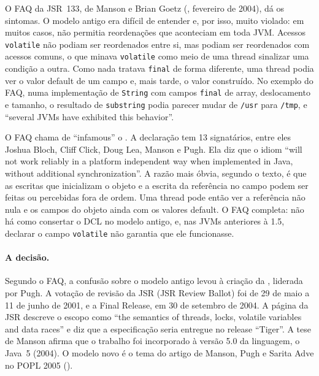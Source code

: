 O FAQ da JSR~133, de Manson e Brian Goetz
(, fevereiro de 2004), dá os sintomas. O
modelo antigo era difícil de entender e, por isso, muito violado: em
muitos casos, não permitia reordenações que aconteciam em toda JVM.
Acessos \texttt{volatile} não podiam ser reordenados entre si, mas
podiam ser reordenados com acessos comuns, o que minava
\texttt{volatile} como meio de uma thread sinalizar uma condição a
outra. Como nada tratava \texttt{final} de forma diferente, uma thread
podia ver o valor default de um campo e, mais tarde, o valor
construído. No exemplo do FAQ, numa implementação de \texttt{String} com campos
\texttt{final} de array, deslocamento e tamanho, o resultado de
\texttt{substring} podia parecer mudar de \texttt{/usr} para
\texttt{/tmp}, e
\enquote{several JVMs have exhibited this behavior}.

O FAQ chama de \enquote{infamous} o .
A declaração  tem 13 signatários, entre eles
Joshua Bloch, Cliff Click, Doug Lea, Manson e Pugh. Ela diz que o
idiom \enquote{will not work reliably in a platform independent way
when implemented in Java, without additional synchronization}. A razão
mais óbvia, segundo o texto, é que as escritas que inicializam o objeto
e a escrita da referência no campo podem ser feitas ou percebidas fora
de ordem. Uma thread pode então ver a referência não nula e os campos
do objeto ainda com os valores default. O FAQ completa: não há como
consertar o DCL no modelo antigo, e, nas JVMs anteriores à 1.5,
declarar o campo \texttt{volatile} não garantia que ele funcionasse.

\paragraph{A decisão.}
Segundo o FAQ, a confusão sobre o modelo antigo levou à criação da
, liderada por Pugh. A votação
de revisão da JSR (JSR Review Ballot) foi de 29 de maio a 11 de junho de 2001, e a Final
Release, em 30 de setembro de 2004. A página da JSR descreve o escopo
como \enquote{the semantics of threads, locks, volatile variables and
data races} e diz que a especificação seria entregue no release
\enquote{Tiger}. A tese de Manson afirma que o trabalho foi incorporado
à versão 5.0 da linguagem, o Java~5 (2004). O modelo novo é o tema do
artigo de Manson, Pugh e Sarita Adve no POPL 2005
().

